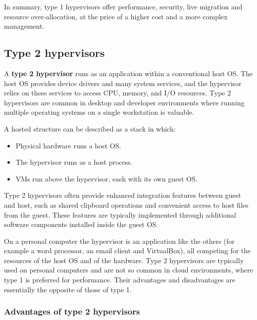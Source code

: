 In summary, type 1 hypervisors offer performance, security, live migration and resource over-allocation, at the price of a higher cost and a more complex management.

\subsection{Type 2 hypervisors}

A \textbf{type 2 hypervisor} runs as an application within a conventional host OS. The host OS provides device drivers and many system services, and the hypervisor relies on these services to access CPU, memory, and I/O resources. Type 2 hypervisors are common in desktop and developer environments where running multiple operating systems on a single workstation is valuable.

A hosted structure can be described as a stack in which:

\begin{itemize}
\item Physical hardware runs a host OS.
\item The hypervisor runs as a host process.
\item VMs run above the hypervisor, each with its own guest OS.
\end{itemize}



Type 2 hypervisors often provide enhanced integration features between guest and host, such as shared clipboard operations and convenient access to host files from the guest. These features are typically implemented through additional software components installed inside the guest OS.

On a personal computer the hypervisor is an application like the others (for example a word processor, an email client and VirtualBox), all competing for the resources of the host OS and of the hardware. Type 2 hypervisors are typically used on personal computers and are not so common in cloud environments, where type 1 is preferred for performance. Their advantages and disadvantages are essentially the opposite of those of type 1.

\begin{center}
\end{center}

\subsubsection*{Advantages of type 2 hypervisors}

